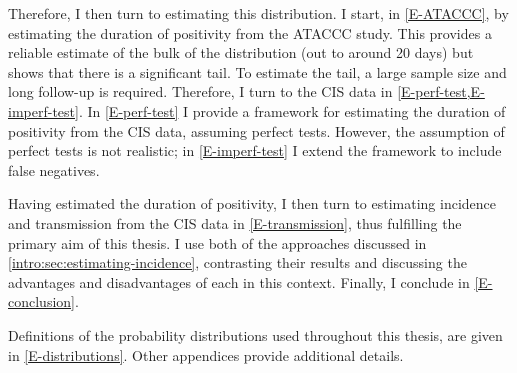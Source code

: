\documentclass[thesis.tex]{subfiles}
\begin{document}
Therefore, I then turn to estimating this distribution.
I start, in \cref{E-ATACCC}, by estimating the duration of positivity from the ATACCC study.
This provides a reliable estimate of the bulk of the distribution (out to around 20 days) but shows that there is a significant tail.
To estimate the tail, a large sample size and long follow-up is required.
Therefore, I turn to the CIS data in \cref{E-perf-test,E-imperf-test}.
In \cref{E-perf-test} I provide a framework for estimating the duration of positivity from the CIS data, assuming perfect tests.
However, the assumption of perfect tests is not realistic; in \cref{E-imperf-test} I extend the framework to include false negatives.

Having estimated the duration of positivity, I then turn to estimating incidence and transmission from the CIS data in \cref{E-transmission}, thus fulfilling the primary aim of this thesis.
I use both of the approaches discussed in \cref{intro:sec:estimating-incidence}, contrasting their results and discussing the advantages and disadvantages of each in this context.
Finally, I conclude in \cref{E-conclusion}.

Definitions of the probability distributions used throughout this thesis, are given in \cref{E-distributions}.
Other appendices provide additional details.

\ifSubfilesClassLoaded{
  \appendix
  
  \listoftodos
}{}
\end{document}
